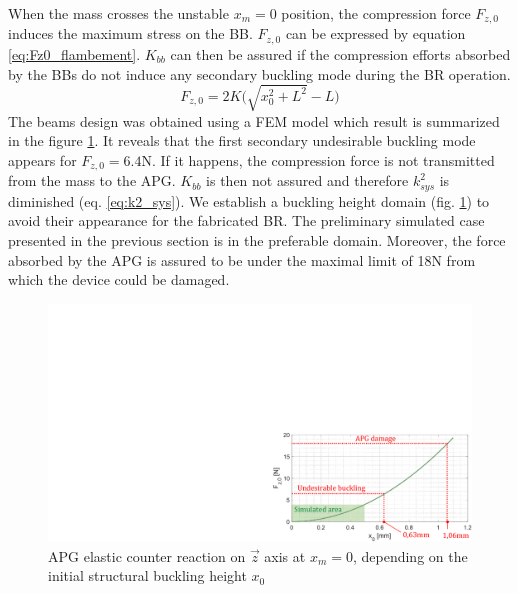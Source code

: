 \documentclass[3p,twocolumn,preprint]{elsarticle}
\begin{document}
When the mass crosses the unstable \mbox{$x_m=0$} position, the compression force $F_{z,0}$ induces the maximum stress on the BB. $F_{z,0}$ can be expressed by equation \ref{eq:Fz0_flambement}. $K_{bb}$ can then be assured if the compression efforts absorbed by the BBs do not induce any secondary buckling mode during the BR operation. 
\begin{equation}
	F_{z,0} = 2K \biggl( \sqrt{x_0^2+L^2}-L \biggr)
	\label{eq:Fz0_flambement}
\end{equation}
The beams design was obtained using a FEM model which result is summarized in the figure \ref{fig:buckling_limit}. It reveals that the first secondary undesirable buckling mode appears for $F_{z,0}=6.4$N. If it happens, the compression force is not transmitted from the mass to the APG. $K_{bb}$ is then not assured and therefore $k^2_{sys}$ is diminished (eq. \ref{eq:k2_sys}). We establish a buckling height domain (fig. \ref{fig:buckling_limit}) to avoid their appearance for the fabricated BR. The preliminary simulated case presented in the previous section is in the preferable domain. Moreover, the force absorbed by the APG is assured to be under the maximal limit of 18N from which the device could be damaged.
\begin{figure}[!htbp]
	\centering
	\captionsetup{justification=centering}
	\includegraphics[trim={17.9cm 0cm 0cm 10cm},clip,width=0.9\linewidth]{figures/buckling_limit.pdf}
	\caption{APG elastic counter reaction on $\vec{z}$ axis at $x_m=0$, depending on the initial structural buckling height $x_0$}
	\label{fig:buckling_limit}
\end{figure}

\end{document}
